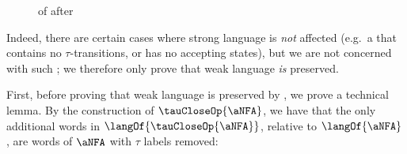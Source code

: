 \begin{figure}[ht]
    \centering
    \caption{ of  after \tauClosure{}}
    \label{fig:closedTNFA}
\end{figure}

Indeed, there are certain cases where strong language is \emph{not} affected
(e.g.\ a \TNFA{} that contains no $\tau$-transitions, or has no accepting
states), but we are not concerned with such \TNFA{}; we therefore only prove
that weak language \emph{is} preserved.

First, before proving that weak language is preserved by \tauClosure{}, we
prove a technical lemma. By the construction of $\tauCloseOp{\aNFA}$, we have
that the only additional words in $\langOf{\tauCloseOp{\aNFA}}$, relative to
$\langOf{\aNFA}$, are words of $\aNFA$ with $\tau$ labels removed:

